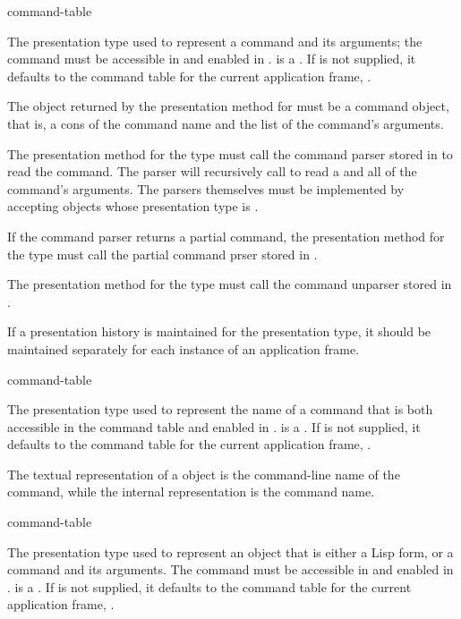  {\key command-table}

The presentation type used to represent a command and its arguments; the command
must be accessible in  and enabled in
.   is a .  If  is not supplied, it defaults to the command
table for the current application frame, .

The object returned by the  presentation method for 
must be a command object, that is, a cons of the command name and the list of
the command's arguments.

The  presentation method for the  type must call the
command parser stored in  to read the command.  The parser
will recursively call  to read a  and all of the
command's arguments.  The parsers themselves must be implemented by accepting
objects whose presentation type is .

If the command parser returns a partial command, the  presentation
method for the  type must call the partial command prser stored in
.

The  presentation method for the  type must call the
command unparser stored in .

If a presentation history is maintained for the  presentation type,
it should be maintained separately for each instance of an application frame.

 {\key command-table}

The presentation type used to represent the name of a command that is both
accessible in the command table  and enabled in
.   is a .  If  is not supplied, it defaults to the command
table for the current application frame, .

The textual representation of a  object is the command-line
name of the command, while the internal representation is the command name.

 {\key command-table}

The presentation type used to represent an object that is either a Lisp form, or
a command and its arguments.  The command must be accessible in
 and enabled in .  
is a .  If  is not supplied, it
defaults to the command table for the current application frame,
.

